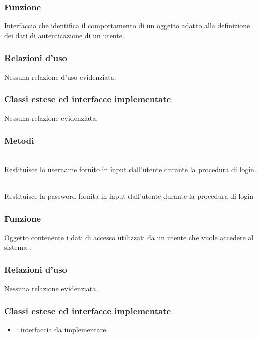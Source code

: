 
\subsubsection*{Funzione}
Interfaccia che identifica il comportamento di un oggetto adatto alla definizione dei dati di autenticazione di un utente.

\subsubsection*{Relazioni d'uso}
Nessuna relazione d'uso evidenziata.

\subsubsection*{Classi estese ed interfacce implementate}
Nessuna relazione evidenziata.

\subsubsection*{Metodi}
\begin{description}
	\item{}\\
Restituisce lo username fornito in input dall'utente durante la procedura di login.
	\item{}\\
Restituisce la password fornita in input dall'utente durante la procedura di login
\end{description}


\subsubsection*{Funzione}
Oggetto contenente i dati di accesso utilizzati da un utente che vuole accedere al sistema \caName.

\subsubsection*{Relazioni d'uso}

Nessuna relazione evidenziata.

\subsubsection*{Classi estese ed interfacce implementate}
\begin{itemize}
	\item {}: interfaccia da implementare.
\end{itemize}

